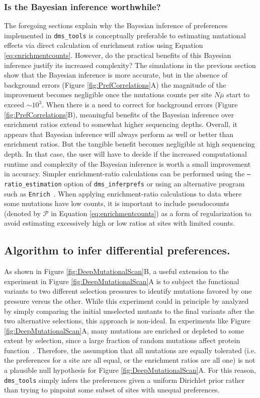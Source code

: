\documentclass[twocolumn]{bmcart}%
\begin{document}
\subsubsection*{Is the Bayesian inference worthwhile?}
The foregoing sections explain why the Bayesian inference of preferences implemented in \texttt{dms\_tools} is conceptually preferable to estimating mutational effects via direct calculation of enrichment ratios using Equation \ref{eq:enrichmentcounts}. However, do the practical benefits of this Bayesian inference justify its increased complexity? The simulations in the previous section show that the Bayesian inference is more accurate, but in the absence of background errors (Figure \ref{fig:PrefCorrelations}A) the magnitude of the improvement becomes negligible once the mutations counts per site $N \overline{\mu}$ start to exceed $\sim10^3$. When there is a need to correct for background errors (Figure \ref{fig:PrefCorrelations}B), meaningful benefits of the Bayesian inference over enrichment ratios extend to somewhat higher sequencing depths. Overall, it appears that Bayesian inference will always perform as well or better than enrichment ratios. But the tangible benefit becomes negligible at high sequencing depth. In that case, the user will have to decide if the increased computational runtime and complexity of the Bayesian inference is worth a small improvement in accuracy. Simpler enrichment-ratio calculations can be performed using the \texttt{--ratio\_estimation} option of \texttt{dms\_inferprefs} or using an alternative program such as \texttt{Enrich}~\cite{fowler2011enrich}. When applying enrichment-ratio calculations to data where some mutations have low counts, it is important to include pseudocounts (denoted by $\mathcal{P}$ in Equation \ref{eq:enrichmentcounts}) as a form of regularization to avoid estimating excessively high or low ratios at sites with limited counts.

\subsection*{Algorithm to infer differential preferences.}
As shown in Figure \ref{fig:DeepMutationalScan}B, a useful extension to the experiment in Figure \ref{fig:DeepMutationalScan}A is to subject the functional variants to two different selection pressures to identify mutations favored by one pressure versus the other. While this experiment could in principle by analyzed by simply comparing the initial unselected mutants to the final variants after the two alternative selections, this approach is non-ideal. In experiments like Figure \ref{fig:DeepMutationalScan}A, many mutations are enriched or depleted to some extent by selection, since a large fraction of random mutations affect protein function~\cite{shortle1985,rennell1991,shafikhani1997,guo2004,bloom2005}. Therefore, the assumption that all mutations are equally tolerated (i.e. the preferences for a site are all equal, or the enrichment ratios are all one) is not a plausible null hypothesis for Figure \ref{fig:DeepMutationalScan}A. For this reason, \texttt{dms\_tools} simply infers the preferences given a uniform Dirichlet prior rather than trying to pinpoint some subset of sites with unequal preferences. 
\end{document}

